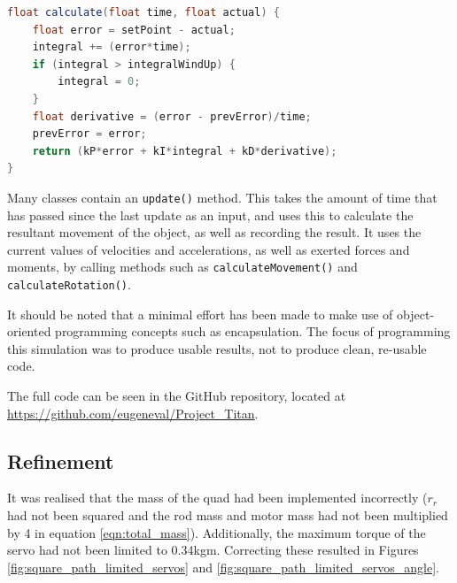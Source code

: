 \documentclass[11pt]{article}
\begin{document}
\begin{lstlisting}[language=Java]
float calculate(float time, float actual) {
    float error = setPoint - actual;
    integral += (error*time);
    if (integral > integralWindUp) {
        integral = 0;
    }
    float derivative = (error - prevError)/time;
    prevError = error;
    return (kP*error + kI*integral + kD*derivative);
}
\end{lstlisting}

Many classes contain an \lstinline|update()| method. This takes the amount of time that has passed since the last update as an input, and uses this to calculate the resultant movement of the object, as well as recording the result. It uses the current values of velocities and accelerations, as well as exerted forces and moments, by calling methods such as \lstinline|calculateMovement()| and \lstinline|calculateRotation()|.

It should be noted that a minimal effort has been made to make use of object-oriented programming concepts such as encapsulation. The focus of programming this simulation was to produce usable results, not to produce clean, re-usable code.

The full code can be seen in the GitHub repository, located at \url{https://github.com/eugeneval/Project_Titan}.


\subsection{Refinement}
It was realised that the mass of the quad had been implemented incorrectly ($r_r$ had not been squared and the rod mass and motor mass had not been multiplied by 4 in equation \ref{eqn:total_mass}). Additionally, the maximum torque of the servo had not been limited to 0.34kgm. Correcting these resulted in Figures \ref{fig:square_path_limited_servos} and \ref{fig:square_path_limited_servos_angle}.
\end{document}
